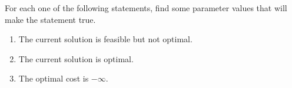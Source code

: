 \begin{enumerate}
For each one of the following statements, find some parameter values that will make the statement true.
\begin{enumerate}
\item The current solution is feasible but not optimal.
\item The current solution is optimal.
\item The optimal cost is $-\infty$.
\end{enumerate}
\end{enumerate}







